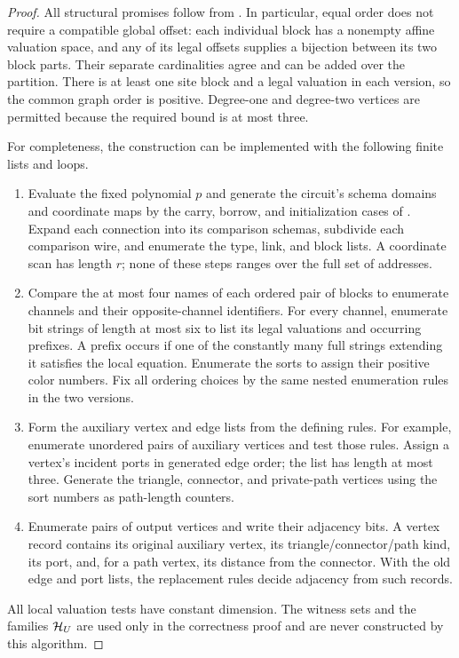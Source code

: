 \begin{proof}
All structural promises follow from .
In particular, equal order does not require a compatible global offset:
each individual block has a nonempty affine valuation space, and any of
its legal offsets supplies a bijection between its two block parts.
Their separate cardinalities agree and can be added over the partition.
There is at least one site block and a legal valuation in each version,
so the common graph order is positive.  Degree-one and degree-two vertices
are permitted because the required bound is at most three.

For completeness, the construction can be implemented with the following
finite lists and loops.
\begin{enumerate}
\item Evaluate the fixed polynomial $p$ and generate the circuit's schema
      domains and coordinate maps by the carry, borrow, and initialization
      cases of .  Expand each connection into
      its comparison schemas, subdivide each comparison wire, and
      enumerate the type, link, and block lists.  A coordinate scan has
      length $r$; none of these steps ranges over the full set of
      addresses.
\item Compare the at most four names of each ordered pair of blocks to
      enumerate channels and their opposite-channel identifiers.  For
      every channel, enumerate bit strings of length at most six to list
      its legal valuations and occurring prefixes.  A prefix occurs if
      one of the constantly many full strings extending it satisfies the
      local equation.  Enumerate the sorts to assign their positive
      color numbers.  Fix all ordering choices by the same nested
      enumeration rules in the two versions.
\item Form the auxiliary vertex and edge lists from the defining rules.
      For example, enumerate unordered pairs of auxiliary vertices and
      test those rules.  Assign a vertex's incident ports in generated
      edge order; the list has length at most three.  Generate the
      triangle, connector, and private-path vertices using the sort
      numbers as path-length counters.
\item Enumerate pairs of output vertices and write their adjacency bits.
      A vertex record contains its original auxiliary vertex, its
      triangle/connector/path kind, its port, and, for a path vertex,
      its distance from the connector.  With the old edge and port lists,
      the replacement rules decide adjacency from such records.
\end{enumerate}
All local valuation tests have constant dimension.  The witness sets and
the families $\mathcal H_U$ are used only in the correctness proof and are never
constructed by this algorithm.


\end{proof}
